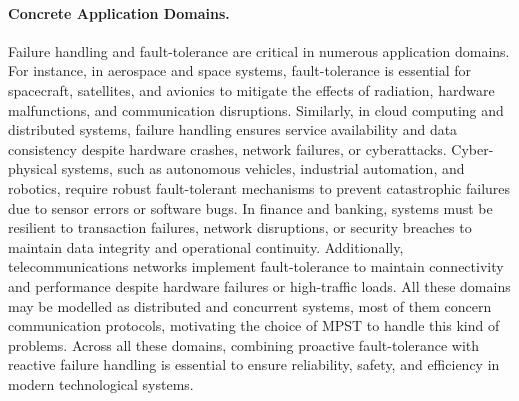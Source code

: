 \documentclass{article}
\theoremstyle{definition}
\theoremstyle{definition}
\begin{document}
\paragraph{Concrete Application Domains.} Failure handling and fault-tolerance are critical in numerous application domains. For instance, in aerospace and space systems, fault-tolerance is essential for spacecraft, satellites, and avionics to mitigate the effects of radiation, hardware malfunctions, and communication disruptions. Similarly, in cloud computing and distributed systems, failure handling ensures service availability and data consistency despite hardware crashes, network failures, or cyberattacks. Cyber-physical systems, such as autonomous vehicles, industrial automation, and robotics, require robust fault-tolerant mechanisms to prevent catastrophic failures due to sensor errors or software bugs. In finance and banking, systems must be resilient to transaction failures, network disruptions, or security breaches to maintain data integrity and operational continuity. Additionally, telecommunications networks implement fault-tolerance to maintain connectivity and performance despite hardware failures or high-traffic loads. All these domains may be modelled as distributed and concurrent systems, most of them concern communication protocols, motivating the choice of MPST to handle this kind of problems. Across all these domains, combining proactive fault-tolerance with reactive failure handling is essential to ensure reliability, safety, and efficiency in modern technological systems.
\end{document}
